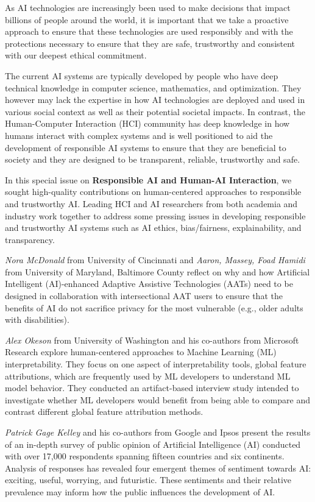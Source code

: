 \documentclass[11pt]{article}
\begin{document}
As AI technologies are increasingly been used to make decisions that impact billions of people around the world,  it is important that we take a proactive approach to ensure that these technologies are used responsibly and with the protections necessary to ensure that they are safe, trustworthy and consistent with our deepest ethical commitment. 
 
The current AI systems are typically developed by people who have deep technical knowledge in computer science, mathematics, and optimization. They however may lack the expertise in how AI technologies are deployed and used in various social context as well as their potential societal impacts.  In contrast, the Human-Computer Interaction (HCI) community has deep knowledge in how humans interact with complex systems and is well positioned to aid the development of responsible AI systems to ensure that they are beneficial to society and they are designed to be transparent, reliable, trustworthy and safe.  

In this special issue on \textbf{Responsible AI and Human-AI Interaction}, we sought high-quality contributions on human-centered approaches to responsible and trustworthy AI. Leading HCI and AI researchers from both academia and industry work together to address some pressing issues in developing responsible and trustworthy AI systems such as AI ethics, bias/fairness, explainability, and transparency. 
  
\textit{Nora McDonald} from University of Cincinnati and \textit{Aaron, Massey, Foad Hamidi} from University of Maryland, Baltimore County reflect on why and how Artificial Intelligent (AI)-enhanced Adaptive Assistive Technologies (AATs) need to be designed in collaboration with intersectional AAT users to ensure that the benefits of AI do not sacrifice privacy for the most vulnerable (e.g., older adults with disabilities).   

\textit{Alex Okeson} from University of Washington and his co-authors from Microsoft Research explore human-centered approaches to Machine Learning (ML) interpretability. They focus on one aspect of interpretability tools, global feature attributions, which are frequently used by ML developers to understand ML model behavior. They conducted an artifact-based interview study intended to investigate whether ML developers would benefit from being able to compare and contrast different global feature attribution methods.

\textit{Patrick Gage Kelley} and his co-authors from Google and Ipsos present the results of an in-depth survey of public opinion of Artificial Intelligence (AI) conducted with over 17,000 respondents spanning fifteen countries and six continents. Analysis of responses has revealed four emergent themes of sentiment towards AI: exciting, useful, worrying, and futuristic. These sentiments and their relative prevalence may inform how the public influences the development of AI.   
\end{document}
